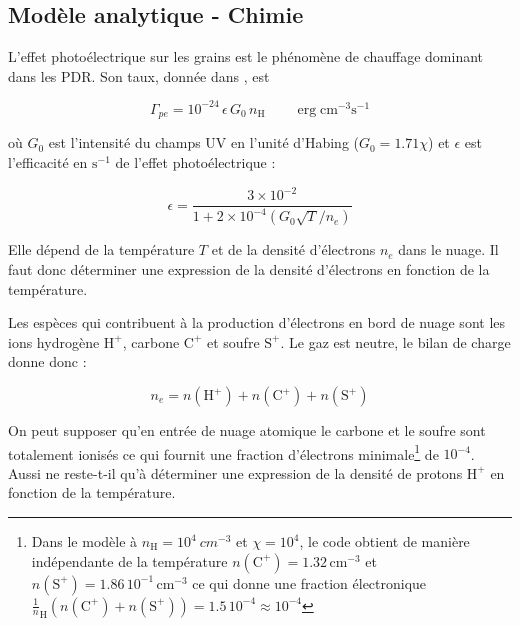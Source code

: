 \subsection{Modèle analytique - Chimie}

L'effet photoélectrique sur les grains est le phénomène de chauffage dominant dans les PDR. Son taux, donnée dans \cite{BakesTielens1994}, est 

\begin{equation}
    \Gamma_{pe} = 10^{-24}\,\epsilon\,G_0\, n_{\mathrm{H}} \qquad \operatorname{erg} \mathrm{cm}^{-3} \mathrm{s}^{-1}
\end{equation} 

où $G_0$ est l'intensité du champs UV en l'unité d'Habing ($G_0 = 1.71\chi$) et $\epsilon$ est l'efficacité en $\mathrm{s}^{-1}$ de l'effet photoélectrique : 

\begin{equation}
    \epsilon = \frac{ 3\times 10^{-2}}{1 +  2\times 10^{-4}(G_0\sqrt{T}/n_e)}
\end{equation}

Elle dépend de la température $T$ et de la densité d'électrons $n_e$ dans le nuage. Il faut donc déterminer une expression de la densité d'électrons en fonction de la température. \newline 

Les espèces qui contribuent à la production d'électrons en bord de nuage sont les ions hydrogène $\mathrm{H}^+$, carbone $\mathrm{C}^+$ et soufre $\mathrm{S}^+$. Le gaz est neutre, le bilan de charge donne donc :

\begin{equation}
    n_e = n(\mathrm{H}^+) + n(\mathrm{C}^+) + n(\mathrm{S}^+)
    \label{eq:bilan:ne}
\end{equation}


On peut supposer qu'en entrée de nuage atomique le carbone et le soufre sont totalement ionisés ce qui fournit une fraction d'électrons minimale\footnote{Dans le modèle à $n_{\mathrm{H}} = 10^4\ cm^{-3}$ et $\chi = 10^4$, le code obtient de manière indépendante de la température $n(\mathrm{C}^+) = 1.32\,\mathrm{cm}^{-3}$ et $n(\mathrm{S}^+) = 1.86\,10^{-1}\,\mathrm{cm}^{-3}$ ce qui donne une fraction électronique $\frac{1}n_\mathrm{H} (n(\mathrm{C}^+)+n(\mathrm{S}^+) ) = 1.5\,10^{-4} \approx 10^{-4}$ } de $10^{-4}$. Aussi ne reste-t-il qu'à déterminer une expression de la densité de protons $\mathrm{H}^+$ en fonction de la température.

